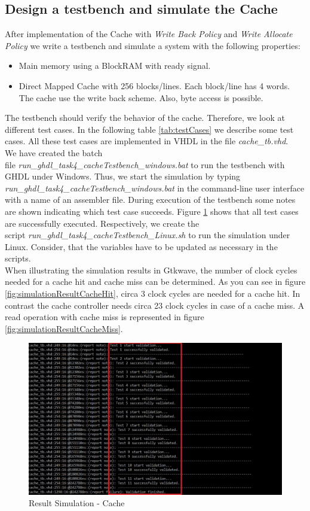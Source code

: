 \subsection{Design a testbench and simulate the Cache}
\label{sec:testbenchSimulationCache}
After implementation of the Cache with \textit{Write Back Policy} and \textit{Write Allocate Policy} we write a testbench and simulate a system with the following properties:
\begin{itemize} 
	\item Main memory using a BlockRAM with ready signal.
	\item Direct Mapped Cache with 256 blocks/lines. Each block/line has 4 words. The cache use the write back scheme. Also, byte access is possible.	
\end{itemize}
The testbench should verify the behavior of the cache. Therefore, we look at different test cases. In the following table \ref{tab:testCases} we describe some test cases. All these test cases are implemented in VHDL in the file \textit{cache\_tb.vhd}.\\
We have created the batch \\file \textit{run\_ghdl\_task4\_cacheTestbench\_windows.bat} to run the testbench with GHDL under Windows. Thus, we start the simulation by typing \textit{run\_ghdl\_task4\_cacheTestbench\_windows.bat} in the command-line user interface with a name of an assembler file. During execution of the testbench some notes are shown indicating which test case succeeds. Figure \ref{fig:simulationResult} shows that all test cases are successfully executed. Respectively, we create the \\script \textit{run\_ghdl\_task4\_cacheTestbench\_Linux.sh} to run the simulation under Linux. Consider, that the variables have to be updated as necessary in the scripts.\\
When illustrating the simulation results in Gtkwave, the number of clock cycles needed for a cache hit and cache miss can be determined. As you can see in figure \ref{fig:simulationResultCacheHit}, circa 3 clock cycles are needed for a cache hit. In contrast the cache controller needs circa 23 clock cycles in case of a cache miss. A read operation with cache miss is represented in figure \ref{fig:simulationResultCacheMiss}.
\begin{figure}
	\centering
	\includegraphics[scale=.5]{pictures/simulationResult}
	\caption{Result Simulation - Cache}
	\label{fig:simulationResult}
\end{figure}
